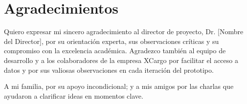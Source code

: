 
\section*{Agradecimientos}

Quiero expresar mi sincero agradecimiento al director de proyecto, Dr. [Nombre del Director], por su orientación experta, sus observaciones críticas y su compromiso con la excelencia académica. Agradezco también al equipo de desarrollo y a los colaboradores de la empresa XCargo por facilitar el acceso a datos y por sus valiosas observaciones en cada iteración del prototipo.

A mi familia, por su apoyo incondicional; y a mis amigos por las charlas que ayudaron a clarificar ideas en momentos clave.

\newpage